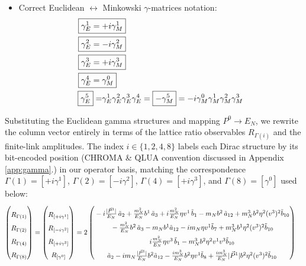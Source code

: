 \begin{itemize}
    \item Correct Euclidean $\longleftrightarrow$ Minkowski $\gamma$-matrices notation:
    \begin{align}
        \Aboxed{\gamma^{1}_{E}=&+i\gamma^{1}_{M}}\\
        \Aboxed{\gamma^{2}_{E}=&-i\gamma^{2}_{M}}\\
        \Aboxed{\gamma^{3}_{E}=&+i\gamma^{3}_{M}}\\
        \Aboxed{\gamma^{4}_{E}=&\gamma^{0}_{M}}\\
        \boxed{\gamma^{5}_{E}}=&\gamma^{1}_{E}\gamma^{2}_{E}\gamma^{3}_{E}\gamma^{4}_{E}=\boxed{-\gamma^{5}_{M}}=-i\gamma^{0}_{M}\gamma^{1}_{M}\gamma^{2}_{M}\gamma^{3}_{M}
    \end{align}
\end{itemize}
Substituting the Euclidean gamma structures and mapping $P^0 \to E_N$, we rewrite the column vector entirely in terms of the lattice ratio observables $R_{\Gamma(i)}$ and the finite-link amplitudes. The index $i \in \{1,2,4,8\}$ labels each Dirac structure by its bit-encoded position (CHROMA \& QLUA convention discussed in Appendix \ref{app:gamma}.) in our operator basis, matching the correspondence $\Gamma(1)=[+i\gamma^1]$, $\Gamma(2)=[-i\gamma^2]$, $\Gamma(4)=[+i\gamma^3]$, and $\Gamma(8)=[\gamma^0]$ used below:
\begingroup\small
\begin{align}
    \begin{pmatrix}
        \rule{0pt}{16pt} R_{\Gamma(1)}\\
        \rule{0pt}{16pt} R_{\Gamma(2)}\\
        \rule{0pt}{16pt} R_{\Gamma(4)}\\
        \rule{0pt}{16pt} R_{\Gamma(8)}
    \end{pmatrix} = \begin{pmatrix}
        \rule{0pt}{16pt} R_{[+i\gamma^1]}\\
        \rule{0pt}{16pt} R_{[-i\gamma^2]}\\
        \rule{0pt}{16pt} R_{[+i\gamma^3]}\\
        \rule{0pt}{16pt} R_{[\gamma^0]}
    \end{pmatrix} &=2\begin{pmatrix}
        \rule{0pt}{16pt} -i\frac{|\vec{P}^1|}{E_N}\, \tilde a_2+  \frac{\mN^2}{E_N} \bvec^1\, \tilde a_3+ i\frac{\mN^2}{E_N} \eta v^1\, \tilde b_1 
		-  \mN  \bvec^2 \, \tilde a_{12}+  \mN^3  \bvec^2 \eta^2 (v^3)^2 \tilde b_{10}\\
         \rule{0pt}{16pt} -  \frac{\mN^2}{E_N} \bvec^2\, \tilde a_3
		-  \mN   \bvec^1  \tilde a_{12}-i \mN \eta  v^1  \tilde b_7+ \mN^3  \bvec^1 \eta^2 (v^3)^2 \tilde b_{10}\\
        \rule{0pt}{16pt} i\frac{\mN^2}{E_N} \eta v^3\, \tilde b_1-  \mN^3 \bvec^2 \eta^2 v^1 v^3\tilde b_{10}\\
         \rule{0pt}{16pt}   \tilde a_2  - i \mN  \frac{|\vec{P}^1|}{E_N} \bvec^2  \tilde a_{12}- \frac{ i \mN^3}{E_N}  \bvec^2 \eta v^1  \tilde b_8+ \frac{i \mN^3}{E_N}  |\vec{P}^1| \bvec^2 \eta^2 (v^3)^2 \tilde b_{10}
    \end{pmatrix}
\end{align}
